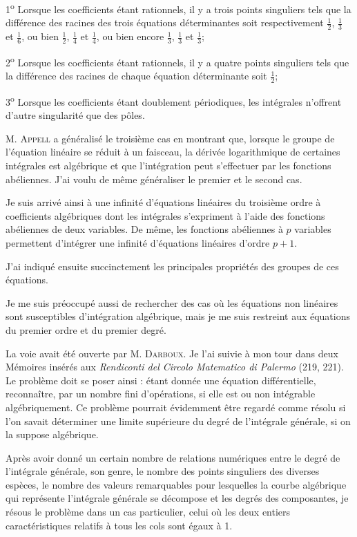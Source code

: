 \documentclass[11pt]{article}
\begin{document}
1\textsuperscript{o} Lorsque les coefficients étant rationnels, il y a trois points singuliers tels que la différence des racines des trois équations déterminantes soit respectivement $\frac12$, $\frac13$ et $\frac16$, ou bien $\frac12$, $\frac14$ et $\frac14$, ou bien encore $\frac13$, $\frac13$ et $\frac13$;

2\textsuperscript{o} Lorsque les coefficients étant rationnels, il y a quatre points singuliers tels que la différence des racines de chaque équation déterminante soit $\frac12$;

3\textsuperscript{o} Lorsque les coefficients étant doublement périodiques, les intégrales n’offrent d’autre singularité que des pôles.

M. \textsc{Appell} a généralisé le troisième cas en montrant que, lorsque le groupe de l’équation linéaire se réduit à un faisceau, la dérivée logarithmique de certaines intégrales est algébrique et que l’intégration peut s’effectuer par les fonctions abéliennes. J’ai voulu de même généraliser le premier et le second cas.

Je suis arrivé ainsi à une infinité d’équations linéaires du troisième ordre à coefficients algébriques dont les intégrales s’expriment à l’aide des fonctions abéliennes de deux variables. De même, les fonctions abéliennes à $p$ variables permettent d’intégrer une infinité d’équations linéaires d’ordre $p+1$.

J’ai indiqué ensuite succinctement les principales propriétés des groupes de ces équations.

Je me suis préoccupé aussi de rechercher des cas où les équations non linéaires sont susceptibles d’intégration algébrique, mais je me suis restreint aux équations du premier ordre et du premier degré.

La voie avait été ouverte par M. \textsc{Darboux}. Je l’ai suivie à mon tour dans deux Mémoires insérés aux \emph{Rendiconti del Circolo Matematico di Palermo} (219, 221). Le problème doit se poser ainsi : étant donnée une équation différentielle, reconnaître, par un nombre fini d’opérations, si elle est ou non intégrable algébriquement. Ce problème pourrait évidemment être regardé comme résolu si l’on savait déterminer une limite supérieure du degré de l’intégrale générale, si on la suppose algébrique.

Après avoir donné un certain nombre de relations numériques entre le degré de l’intégrale générale, son genre, le nombre des points singuliers des diverses espèces, le nombre des valeurs remarquables pour lesquelles la courbe algébrique qui représente l’intégrale générale se décompose et les degrés des composantes, je résous le problème dans un cas particulier, celui où les deux entiers caractéristiques relatifs à tous les cols sont égaux à 1.
\end{document}
